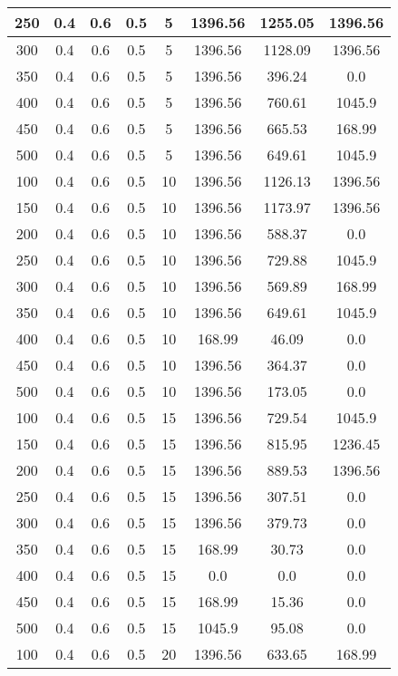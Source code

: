 \documentclass[a4paper, 12pt]{extreport}
\begin{document}
\begin{itemize}
\begin{longtable}{|c|c|c|c|c|c|c|c|}
			250 & 0.4 & 0.6 & 0.5 & 5 & 1396.56 & 1255.05 & 1396.56 \\\hline
			300 & 0.4 & 0.6 & 0.5 & 5 & 1396.56 & 1128.09 & 1396.56 \\\hline
			350 & 0.4 & 0.6 & 0.5 & 5 & 1396.56 & 396.24 & 0.0 \\\hline
			400 & 0.4 & 0.6 & 0.5 & 5 & 1396.56 & 760.61 & 1045.9 \\\hline
			450 & 0.4 & 0.6 & 0.5 & 5 & 1396.56 & 665.53 & 168.99 \\\hline
			500 & 0.4 & 0.6 & 0.5 & 5 & 1396.56 & 649.61 & 1045.9 \\\hline
			100 & 0.4 & 0.6 & 0.5 & 10 & 1396.56 & 1126.13 & 1396.56 \\\hline
			150 & 0.4 & 0.6 & 0.5 & 10 & 1396.56 & 1173.97 & 1396.56 \\\hline
			200 & 0.4 & 0.6 & 0.5 & 10 & 1396.56 & 588.37 & 0.0 \\\hline
			250 & 0.4 & 0.6 & 0.5 & 10 & 1396.56 & 729.88 & 1045.9 \\\hline
			300 & 0.4 & 0.6 & 0.5 & 10 & 1396.56 & 569.89 & 168.99 \\\hline
			350 & 0.4 & 0.6 & 0.5 & 10 & 1396.56 & 649.61 & 1045.9 \\\hline
			400 & 0.4 & 0.6 & 0.5 & 10 & 168.99 & 46.09 & 0.0 \\\hline
			450 & 0.4 & 0.6 & 0.5 & 10 & 1396.56 & 364.37 & 0.0 \\\hline
			500 & 0.4 & 0.6 & 0.5 & 10 & 1396.56 & 173.05 & 0.0 \\\hline
			100 & 0.4 & 0.6 & 0.5 & 15 & 1396.56 & 729.54 & 1045.9 \\\hline
			150 & 0.4 & 0.6 & 0.5 & 15 & 1396.56 & 815.95 & 1236.45 \\\hline
			200 & 0.4 & 0.6 & 0.5 & 15 & 1396.56 & 889.53 & 1396.56 \\\hline
			250 & 0.4 & 0.6 & 0.5 & 15 & 1396.56 & 307.51 & 0.0 \\\hline
			300 & 0.4 & 0.6 & 0.5 & 15 & 1396.56 & 379.73 & 0.0 \\\hline
			350 & 0.4 & 0.6 & 0.5 & 15 & 168.99 & 30.73 & 0.0 \\\hline
			400 & 0.4 & 0.6 & 0.5 & 15 & 0.0 & 0.0 & 0.0 \\\hline
			450 & 0.4 & 0.6 & 0.5 & 15 & 168.99 & 15.36 & 0.0 \\\hline
			500 & 0.4 & 0.6 & 0.5 & 15 & 1045.9 & 95.08 & 0.0 \\\hline
			100 & 0.4 & 0.6 & 0.5 & 20 & 1396.56 & 633.65 & 168.99 \\\hline

\end{longtable}
\end{itemize}
\end{document}
